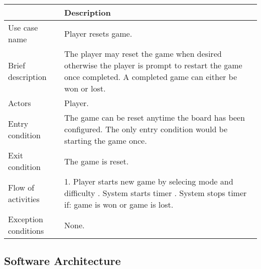 \documentclass[12pt, a4]{report}
\begin{document}
	\begin{table}[ht]
	\begin{tabular}{|p{4cm}|p{12cm}|}
		\hline
		& Description \\
		\hline
		Use case name & Player resets game. \\
		Brief description & The player may reset the game when desired otherwise the player is prompt to restart the game once completed. A completed game can either be won or lost. \\
		Actors & Player. \\
		Entry condition & The game can be reset anytime the board has been configured. The only entry condition would be starting the game once. \\
		Exit condition & The game is reset. \\
		Flow of activities & 1. Player starts new game by selecing mode and difficulty \newline 2. System starts timer \newline 3. System stops timer if: game is won or game is lost. \\
		Exception conditions & None.\\
		\hline
	\end{tabular}
	\end{table}
	
	\pagebreak
	
	\subsection{Software Architecture}
	
\end{document}
